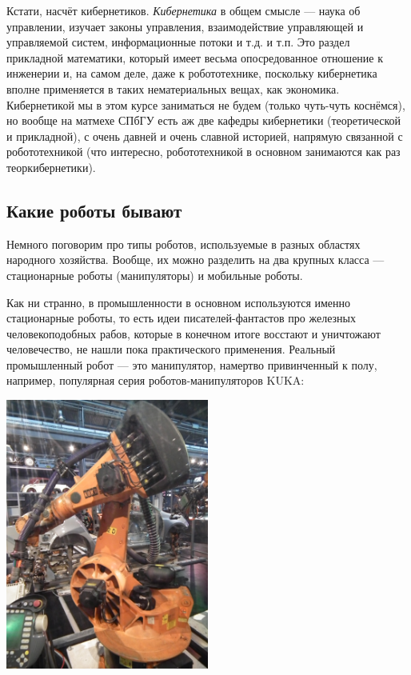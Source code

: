 \documentclass{../../text-style}
\begin{document}
Кстати, насчёт кибернетиков.
\emph{Кибернетика} в общем смысле --- наука об управлении, изучает законы управления, взаимодействие управляющей и управляемой систем, информационные потоки и т.д. и т.п.
Это раздел прикладной математики, который имеет весьма опосредованное отношение к инженерии и, на самом деле, даже к робототехнике, поскольку кибернетика вполне применяется в таких нематериальных вещах, как экономика.
Кибернетикой мы в этом курсе заниматься не будем (только чуть-чуть коснёмся), но вообще на матмехе СПбГУ есть аж две кафедры кибернетики (теоретической и прикладной), с очень давней и очень славной историей, напрямую связанной с робототехникой (что интересно, робототехникой в основном занимаются как раз теоркибернетики).

\subsection{Какие роботы бывают}

Немного поговорим про типы роботов, используемые в разных областях народного хозяйства. 
Вообще, их можно разделить на два крупных класса --- стационарные роботы (манипуляторы) и мобильные роботы.

Как ни странно, в промышленности в основном используются именно стационарные роботы, то есть идеи писателей-фантастов про железных человекоподобных рабов, которые в конечном итоге восстают и уничтожают человечество, не нашли пока практического применения.
Реальный промышленный робот --- это манипулятор, намертво привинченный к полу, например, популярная серия роботов-манипуляторов KUKA:

\begin{center}
    \includegraphics[width=0.5\textwidth]{kuka.png}
\end{center}
\end{document}
